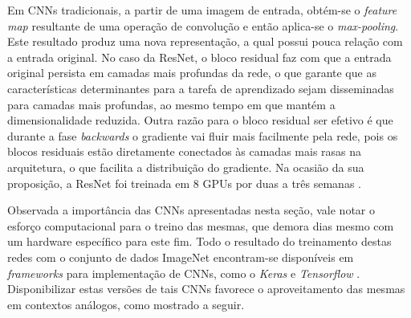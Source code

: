 Em CNNs tradicionais, a partir de uma imagem de entrada, obtém-se o  \emph{feature map}  resultante de uma operação de convolução e então aplica-se o \emph{max-pooling}. Este resultado produz uma nova representação, a qual possui pouca relação com a entrada original. No caso da ResNet, o bloco residual faz com que a entrada original persista em camadas mais profundas da rede, o que garante que as características determinantes para a tarefa de aprendizado sejam disseminadas para camadas mais profundas, ao mesmo tempo em que mantém a dimensionalidade reduzida. Outra razão para o bloco residual ser efetivo é que durante a fase \emph{backwards} o gradiente vai fluir mais facilmente pela rede, pois os blocos residuais estão diretamente conectados às camadas mais rasas na arquitetura, o que facilita a distribuição do gradiente. Na ocasião da sua proposição, a ResNet foi treinada em 8 GPUs por duas a três semanas \cite{resnet}.

Observada a importância das CNNs apresentadas nesta seção, vale notar o esforço computacional para o treino das mesmas, que demora dias mesmo com um hardware específico para este fim. Todo o resultado do treinamento destas redes com o conjunto de dados ImageNet encontram-se disponíveis em \emph{frameworks} para implementação de CNNs, como o  \emph{Keras} \cite{keras:applications} e \emph{Tensorflow} \cite{tensorflow:models}. Disponibilizar estas versões de tais CNNs favorece o aproveitamento das mesmas em contextos análogos, como mostrado a seguir.
